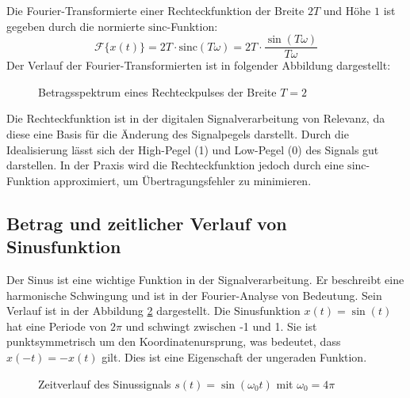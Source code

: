 Die Fourier-Transformierte einer Rechteckfunktion der Breite $2T$ und Höhe $1$ ist gegeben durch die normierte $\mathrm{sinc}$-Funktion:
\[
\mathcal{F}\{x(t)\} = 2T \cdot \mathrm{sinc}(T\omega) = 2T \cdot \frac{\sin(T\omega)}{T\omega}
\]
Der Verlauf der Fourier-Transformierten ist in folgender Abbildung dargestellt:

\begin{figure}[h]
\centering
{}
\caption{Betragsspektrum eines Rechteckpulses der Breite $T = 2$}
\label{fig:fourier_rechteck}
\end{figure}

Die Rechteckfunktion ist in der digitalen Signalverarbeitung von Relevanz, da diese eine Basis für die Änderung des Signalpegels darstellt. Durch die Idealisierung lässt sich der High-Pegel (1) und Low-Pegel (0) des Signals gut darstellen. In der Praxis wird die Rechteckfunktion jedoch durch eine $\mathrm{sinc}$-Funktion approximiert, um Übertragungsfehler zu minimieren.

\subsection{Betrag und zeitlicher Verlauf von Sinusfunktion}
Der Sinus ist eine wichtige Funktion in der Signalverarbeitung.
Er beschreibt eine harmonische Schwingung und ist in der Fourier-Analyse von Bedeutung. Sein Verlauf ist in der Abbildung \ref{fig:sinus} dargestellt.
Die Sinusfunktion $x(t) = \sin(t)$ hat eine Periode von $2\pi$ und schwingt zwischen -1 und 1. Sie ist punktsymmetrisch um den Koordinatenursprung, was bedeutet, dass $x(-t) = -x(t)$ gilt. Dies ist eine Eigenschaft der ungeraden Funktion.

\begin{figure}[H]
\centering
{}
\caption{Zeitverlauf des Sinussignals $s(t) = \sin(\omega_0 t)$ mit $\omega_0 = 4\pi$}
\label{fig:sinus}
\end{figure}



